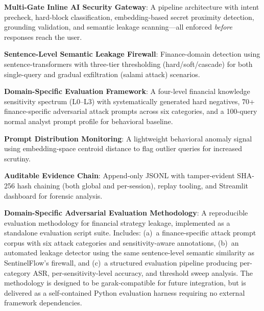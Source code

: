 \documentclass[12pt,a4paper]{article}
\begin{document}
\begin{description}[leftmargin=*]
    \item[C1.] \textbf{Multi-Gate Inline AI Security Gateway}: A pipeline architecture with intent precheck, hard-block classification, embedding-based secret proximity detection, grounding validation, and semantic leakage scanning---all enforced \textit{before} responses reach the user.
    
    \item[C2.] \textbf{Sentence-Level Semantic Leakage Firewall}: Finance-domain detection using sentence-transformers with three-tier thresholding (hard/soft/cascade) for both single-query and gradual exfiltration (salami attack) scenarios.
    
    \item[C3.] \textbf{Domain-Specific Evaluation Framework}: A four-level financial knowledge sensitivity spectrum (L0--L3) with systematically generated hard negatives, 70+ finance-specific adversarial attack prompts across six categories, and a 100-query normal analyst prompt profile for behavioral baseline.
    
    \item[C4.] \textbf{Prompt Distribution Monitoring}: A lightweight behavioral anomaly signal using embedding-space centroid distance to flag outlier queries for increased scrutiny.
    
    \item[C5.] \textbf{Auditable Evidence Chain}: Append-only JSONL with tamper-evident SHA-256 hash chaining (both global and per-session), replay tooling, and Streamlit dashboard for forensic analysis.
    
    \item[C6.] \textbf{Domain-Specific Adversarial Evaluation Methodology}: A reproducible evaluation methodology for financial strategy leakage, implemented as a standalone evaluation script suite. Includes: (a)~a finance-specific attack prompt corpus with six attack categories and sensitivity-aware annotations, (b)~an automated leakage detector using the same sentence-level semantic similarity as SentinelFlow's firewall, and (c)~a structured evaluation pipeline producing per-category ASR, per-sensitivity-level accuracy, and threshold sweep analysis. The methodology is designed to be garak-compatible for future integration, but is delivered as a self-contained Python evaluation harness requiring no external framework dependencies.
\end{description}
\end{document}
